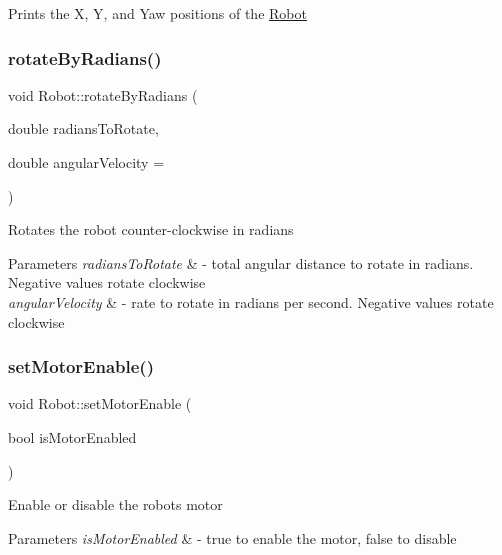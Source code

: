 Prints the X, Y, and Yaw positions of the \hyperlink{classRobot}{Robot} \mbox{\label{classRobot_a4e139756e0d56b718ff5c19daa7c5f57}} 
\subsubsection{\texorpdfstring{rotate\+By\+Radians()}{rotateByRadians()}}
{\footnotesize\ttfamily void Robot\+::rotate\+By\+Radians (\begin{DoxyParamCaption}\item[{double}]{radians\+To\+Rotate,  }\item[{double}]{angular\+Velocity = {} }\end{DoxyParamCaption})}

Rotates the robot counter-\/clockwise in radians


\begin{DoxyParams}{Parameters}
{\em radians\+To\+Rotate} & -\/ total angular distance to rotate in radians. Negative values rotate clockwise \\
\hline
{\em angular\+Velocity} & -\/ rate to rotate in radians per second. Negative values rotate clockwise \\
\hline
\end{DoxyParams}
\mbox{\label{classRobot_ae59cdda4345c38cff6157f78a417b102}} 
\subsubsection{\texorpdfstring{set\+Motor\+Enable()}{setMotorEnable()}}
{\footnotesize\ttfamily void Robot\+::set\+Motor\+Enable (\begin{DoxyParamCaption}\item[{bool}]{is\+Motor\+Enabled }\end{DoxyParamCaption})}

Enable or disable the robot\textquotesingle{}s motor


\begin{DoxyParams}{Parameters}
{\em is\+Motor\+Enabled} & -\/ true to enable the motor, false to disable \\
\hline
\end{DoxyParams}
\mbox{\label{classRobot_a1135ca4f689f1d8354cb03c3a095934e}} 
